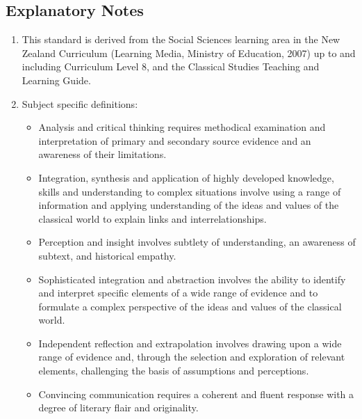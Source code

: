 \documentclass[a4paper,10pt]{article}
\begin{document}
\subsection{Explanatory Notes}
\begin{enumerate}
  \item This standard is derived from the Social Sciences learning area in the New Zealand Curriculum (Learning Media, Ministry of Education, 2007) up to and including Curriculum Level 8, and the Classical Studies Teaching and Learning Guide.
  \item Subject specific definitions:
  \begin{itemize}
    \item Analysis and critical thinking requires methodical examination and interpretation of primary and secondary source
          evidence and an awareness of their limitations.
    \item Integration, synthesis and application of highly developed knowledge, skills and understanding to complex situations
          involve using a range of information and applying understanding of the ideas and values of the classical world to
          explain links and interrelationships.
    \item Perception and insight involves subtlety of understanding, an awareness of subtext, and historical empathy.
    \item Sophisticated integration and abstraction involves the ability to identify and interpret specific elements of a wide
          range of evidence and to formulate a complex perspective of the ideas and values of the classical world.
    \item Independent reflection and extrapolation involves drawing upon a wide range of evidence and, through the selection and
          exploration of relevant elements, challenging the basis of assumptions and perceptions.
    \item Convincing communication requires a coherent and fluent response with a degree of literary flair and originality.
  \end{itemize}
\end{enumerate}
\end{document}
